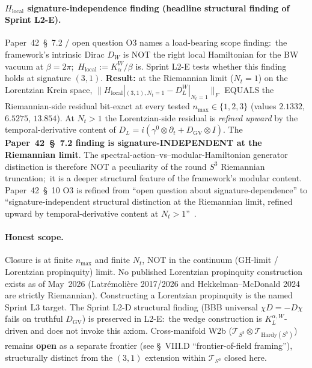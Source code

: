 \documentclass[11pt]{article}
\providecommand{\Tcal}{\mathcal{T}}
\begin{document}
\paragraph{$H_{\mathrm{local}}$ signature-independence finding
(headline structural finding of Sprint L2-E).}
Paper~42~\S~7.2 / open question O3 names a load-bearing scope finding:\
the framework's intrinsic Dirac $D_W$ is NOT the right local
Hamiltonian for the BW vacuum at $\beta = 2\pi$;\ $H_{\mathrm{local}} :=
K_\alpha^W / \beta$ is.  Sprint L2-E tests whether this finding holds
at signature $(3, 1)$.  \textbf{Result:} at the Riemannian limit
($N_t = 1$) on the Lorentzian Krein space,
$\|H_{\mathrm{local}}|_{(3, 1), N_t = 1} - D_L^W|_{N_t = 1}\|_F$
EQUALS the Riemannian-side residual bit-exact at every tested
$n_{\max} \in \{1, 2, 3\}$ (values $2.1332$, $6.5275$, $13.854$).
At $N_t > 1$ the Lorentzian-side residual is \emph{refined upward}
by the temporal-derivative content of $D_L = i (\gamma^0 \otimes
\partial_t + D_{\mathrm{GV}} \otimes I)$.  The
\textbf{Paper~42~\S~7.2 finding is signature-INDEPENDENT at the
Riemannian limit}.  The spectral-action--vs--modular-Hamiltonian
generator distinction is therefore NOT a peculiarity of the round
$S^3$ Riemannian truncation;\ it is a deeper structural feature of
the framework's modular content.  Paper~42~\S~10 O3 is refined from
``open question about signature-dependence'' to ``signature-independent
structural distinction at the Riemannian limit, refined upward by
temporal-derivative content at $N_t > 1$''~\cite{paper42}.

\paragraph{Honest scope.}
Closure is at finite $n_{\max}$ and finite $N_t$, NOT in the
continuum (GH-limit / Lorentzian propinquity) limit.  No published
Lorentzian propinquity construction exists as of May~2026
(Latr\'emoli\`ere 2017/2026 and Hekkelman--McDonald 2024 are strictly
Riemannian).  Constructing a Lorentzian propinquity is the named
Sprint L3 target.  The Sprint L2-D structural finding (BBB universal
$\chi D = -D\chi$ fails on truthful $D_{\mathrm{GV}}$) is preserved
in L2-E:\ the wedge construction is $K_L^{\alpha, W}$-driven and does
not invoke this axiom.  Cross-manifold W2b
($\Tcal_{S^3} \otimes \Tcal_{\mathrm{Hardy}(S^5)}$) remains
\textbf{open} as a separate frontier (see \S~VIII.D
``frontier-of-field framing''), structurally distinct from the
$(3, 1)$ extension within $\Tcal_{S^3}$ closed here.
\end{document}
